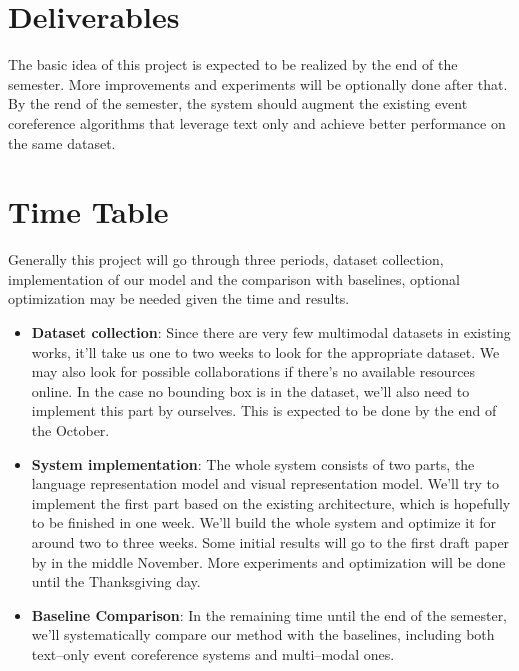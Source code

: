 \documentclass[11pt,a4paper]{article}
\newcommand{\bo}{\mathbf{o}}
\newcommand{\bw}{\mathbf{w}}
\begin{document}

\section{Deliverables}
The basic idea of this project is expected to be realized by the end of the semester. More improvements and experiments will be optionally done after that. By the rend of the semester, the system should augment the existing event coreference algorithms that leverage text only and achieve better performance on the same dataset. 
\section{Time Table}
Generally this project will go through three periods, dataset collection, implementation of our model and the comparison with baselines, optional optimization may be needed given the time and results.

\begin{itemize}
    \item \textbf{Dataset collection}: Since there are very few multimodal datasets in existing works, it'll take us one to two weeks to look for the appropriate dataset. We may also look for possible collaborations if there's no available resources online. In the case no bounding box is in the dataset, we'll also need to implement this part by ourselves. This is expected to be done by the end of the October.
    \item \textbf{System implementation}: The whole system consists of two parts, the language representation model and visual representation model. We'll try to implement the first part based on the existing architecture, which is hopefully to be finished in one week. We'll build the whole system and optimize it for around two to three weeks. Some initial results will go to the first draft paper by in the middle November. More experiments and optimization will be done until the Thanksgiving day.   
    \item \textbf{Baseline Comparison}: In the remaining time until the end of the semester, we'll systematically compare our method with the baselines, including both text--only event coreference systems and multi--modal ones. 
\end{itemize}




\appendix
\end{document}
